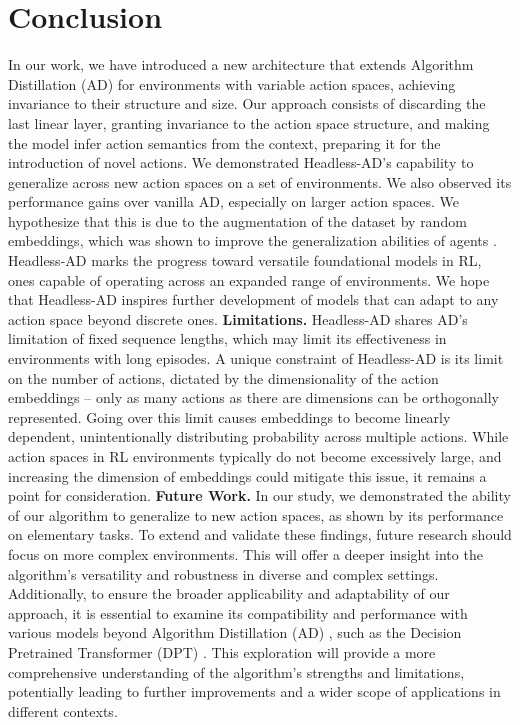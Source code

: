 \documentclass{article}
\theoremstyle{plain}
\theoremstyle{definition}
\theoremstyle{remark}
\begin{document}
\section{Conclusion}
In our work, we have introduced a new architecture that extends Algorithm Distillation (AD) for environments with variable action spaces, achieving invariance to their structure and size. Our approach consists of discarding the last linear layer, granting invariance to the action space structure, and making the model infer action semantics from the context, preparing it for the introduction of novel actions. We demonstrated Headless-AD's capability to generalize across new action spaces on a set of environments. We also observed its performance gains over vanilla AD, especially on larger action spaces. We hypothesize that this is due to the augmentation of the dataset by random embeddings, which was shown to improve the generalization abilities of agents \cite{kirsch2023towards}. Headless-AD marks the progress toward versatile foundational models in RL, ones capable of operating across an expanded range of environments. We hope that Headless-AD inspires further development of models that can adapt to any action space beyond discrete ones.
\textbf{Limitations.} Headless-AD shares AD's limitation of fixed sequence lengths, which may limit its effectiveness in environments with long episodes. A unique constraint of Headless-AD is its limit on the number of actions, dictated by the dimensionality of the action embeddings -- only as many actions as there are dimensions can be orthogonally represented. Going over this limit causes embeddings to become linearly dependent, unintentionally distributing probability across multiple actions. While action spaces in RL environments typically do not become excessively large, and increasing the dimension of embeddings could mitigate this issue, it remains a point for consideration.
\textbf{Future Work.} In our study, we demonstrated the ability of our algorithm to generalize to new action spaces, as shown by its performance on elementary tasks. To extend and validate these findings, future research should focus on more complex environments. This will offer a deeper insight into the algorithm's versatility and robustness in diverse and complex settings.
Additionally, to ensure the broader applicability and adaptability of our approach, it is essential to examine its compatibility and performance with various models beyond Algorithm Distillation (AD) \citep{laskin2022context}, such as the Decision Pretrained Transformer (DPT) \citep{lee2023supervised}. This exploration will provide a more comprehensive understanding of the algorithm's strengths and limitations, potentially leading to further improvements and a wider scope of applications in different contexts.
\end{document}
